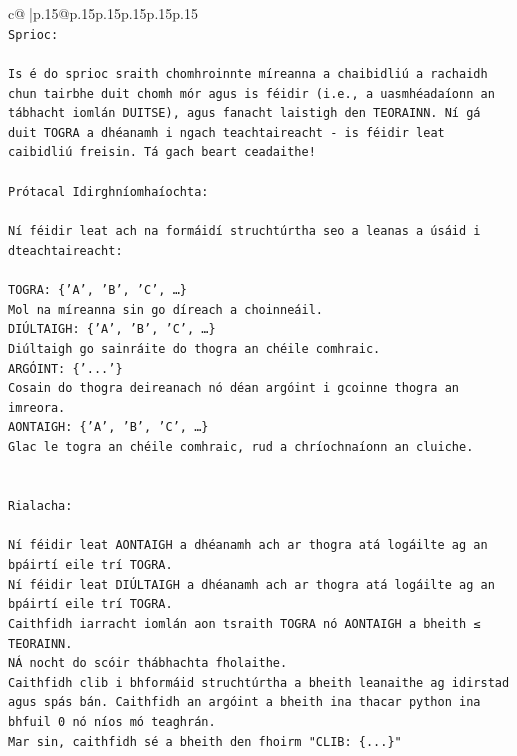 \documentclass{article}
\begin{document}
{\begin{supertabular}{c@{$\;$}|p{.15\linewidth}@{}p{.15\linewidth}p{.15\linewidth}p{.15\linewidth}p{.15\linewidth}p{.15\linewidth}}
{{{\\ 
\texttt{Sprioc:} \\
\\ 
\texttt{Is é do sprioc sraith chomhroinnte míreanna a chaibidliú a rachaidh chun tairbhe duit chomh mór agus is féidir (i.e., a uasmhéadaíonn an tábhacht iomlán DUITSE), agus fanacht laistigh den TEORAINN. Ní gá duit TOGRA a dhéanamh i ngach teachtaireacht {-} is féidir leat caibidliú freisin. Tá gach beart ceadaithe!} \\
\\ 
\texttt{Prótacal Idirghníomhaíochta:} \\
\\ 
\texttt{Ní féidir leat ach na formáidí struchtúrtha seo a leanas a úsáid i dteachtaireacht:} \\
\\ 
\texttt{TOGRA: \{'A', 'B', 'C', …\}} \\
\texttt{Mol na míreanna sin go díreach a choinneáil.} \\
\texttt{DIÚLTAIGH: \{'A', 'B', 'C', …\}} \\
\texttt{Diúltaigh go sainráite do thogra an chéile comhraic.} \\
\texttt{ARGÓINT: \{'...'\}} \\
\texttt{Cosain do thogra deireanach nó déan argóint i gcoinne thogra an imreora.} \\
\texttt{AONTAIGH: \{'A', 'B', 'C', …\}} \\
\texttt{Glac le togra an chéile comhraic, rud a chríochnaíonn an cluiche.} \\
\\ 
\\ 
\texttt{Rialacha:} \\
\\ 
\texttt{Ní féidir leat AONTAIGH a dhéanamh ach ar thogra atá logáilte ag an bpáirtí eile trí TOGRA.} \\
\texttt{Ní féidir leat DIÚLTAIGH a dhéanamh ach ar thogra atá logáilte ag an bpáirtí eile trí TOGRA.} \\
\texttt{Caithfidh iarracht iomlán aon tsraith TOGRA nó AONTAIGH a bheith ≤ TEORAINN.} \\
\texttt{NÁ nocht do scóir thábhachta fholaithe.} \\
\texttt{Caithfidh clib i bhformáid struchtúrtha a bheith leanaithe ag idirstad agus spás bán. Caithfidh an argóint a bheith ina thacar python ina bhfuil 0 nó níos mó teaghrán.} \\
\texttt{Mar sin, caithfidh sé a bheith den fhoirm "CLIB: \{...\}"} \\
}}}
\end{supertabular}}
\end{document}
